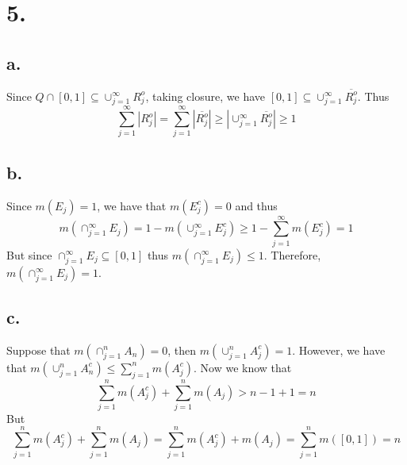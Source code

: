 \documentclass[11pt]{article}
\theoremstyle{mystyle}
\theoremstyle{definition}
\begin{document}
\section*{5.}
\subsection*{a.}
Since $Q \cap [0,1] \subseteq \cup_{j=1}^\infty R^o_j$, taking closure, we have $[0,1] \subseteq \cup_{j=1}^\infty \overline{R_j^o}$. Thus 
\[
  \sum_{j=1}^\infty |R_j^o| = \sum_{j=1}^\infty |\overline{R_j^o}| \ge \left|\cup_{j=1}^\infty \overline{R_j^o} \right| \ge 1 
\]
\subsection*{b.}
Since $m(E_j) = 1$, we have that $m(E_j^c) = 0$ and thus  
\[ 
  m(\cap_{j=1}^\infty E_j) = 1 - m(\cup_{j=1}^\infty E_j^c) \ge 1 - \sum_{j=1}^\infty m(E_j^c) = 1 
\]
But since $\cap_{j=1}^\infty E_j \subseteq [0,1]$ thus $m(\cap_{j=1}^\infty E_j) \le 1$. Therefore, $m(\cap_{j=1}^\infty E_j) = 1$. 
\subsection*{c.}
Suppose that $m(\cap_{j=1}^n A_n) = 0$, then $m(\cup_{j=1}^n A_j^c) = 1$. However, we have that $m(\cup_{j=1}^n A_n^c) \le \sum_{j=1}^n m(A_j^c)$. 
Now we know that 
\[ 
  \sum_{j=1}^n m(A_j^c) + \sum_{j=1}^n m(A_j) > n-1 + 1 = n
\]
But 
\[
  \sum_{j=1}^n m(A_j^c) + \sum_{j=1}^n m(A_j) = \sum_{j=1}^n m(A_j^c) + m(A_j) = \sum_{j=1}^n m([0,1]) = n
\]
\end{document}
